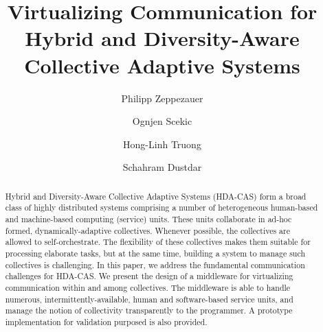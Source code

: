 \documentclass{llncs}
\begin{document}
%
\pagestyle{headings}  %

%
\title{Virtualizing Communication for Hybrid and Diversity-Aware Collective Adaptive Systems}
\author{Philipp Zeppezauer \and Ognjen Scekic \and Hong-Linh Truong \and Schahram Dustdar}




\maketitle


\begin{abstract}

Hybrid and Diversity-Aware Collective Adaptive Systems (HDA-CAS) form a 
broad class of highly distributed systems comprising a number of
heterogeneous human-based and machine-based computing (service) units.
These units %
collaborate in ad-hoc formed, dynamically-adaptive collectives.  Whenever possible, the collectives are allowed to self-orchestrate. The flexibility of these collectives makes them suitable for processing elaborate tasks, but at the same time, building a system to manage such collectives is challenging. In this paper, we address the fundamental communication challenges for HDA-CAS. 
We present the design of a middleware for virtualizing communication  within and among collectives.
The middleware is able to handle numerous, intermittently-available, human and software-based service units, and manage the notion of collectivity transparently to the programmer. A prototype implementation for validation purposed is also provided.
\end{abstract}
\end{document}
